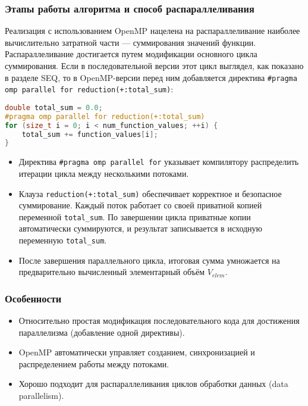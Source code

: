 \documentclass[12pt]{article}
\begin{document}
\subsubsection*{Этапы работы алгоритма и способ распараллеливания}
Реализация с использованием OpenMP нацелена на распараллеливание наиболее вычислительно затратной части — суммирования значений функции.
Распараллеливание достигается путем модификации основного цикла суммирования. Если в последовательной версии этот цикл выглядел, как показано в разделе SEQ, то в OpenMP-версии перед ним добавляется директива \texttt{\#pragma omp parallel for reduction(+:total\_sum)}:
\begin{lstlisting}[language=C++, basicstyle=\small\ttfamily, frame=none, numbers=none]
double total_sum = 0.0;
#pragma omp parallel for reduction(+:total_sum)
for (size_t i = 0; i < num_function_values; ++i) {
    total_sum += function_values[i];
}
\end{lstlisting}
\begin{itemize}
  \item Директива \texttt{\#pragma omp parallel for} указывает компилятору распределить итерации цикла между несколькими потоками.
  \item Клауза \texttt{reduction(+:total\_sum)} обеспечивает корректное и безопасное суммирование. Каждый поток работает со своей приватной копией переменной \texttt{total\_sum}. По завершении цикла приватные копии автоматически суммируются, и результат записывается в исходную переменную \texttt{total\_sum}.
  \item После завершения параллельного цикла, итоговая сумма умножается на предварительно вычисленный элементарный объём $V_{elem}$.
\end{itemize}

\subsubsection*{Особенности}
\begin{itemize}
  \item Относительно простая модификация последовательного кода для достижения параллелизма (добавление одной директивы).
  \item OpenMP автоматически управляет созданием, синхронизацией и распределением работы между потоками.
  \item Хорошо подходит для распараллеливания циклов обработки данных (data parallelism).
\end{itemize}
\end{document}
